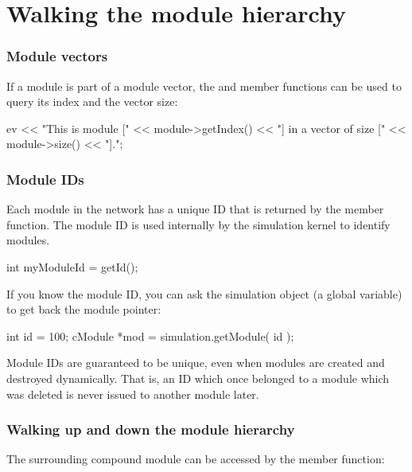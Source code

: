 \section{Walking the module hierarchy}
\label{sec:simple-modules:walking-module-hierarchy}

\subsubsection{Module vectors}


If a module is part of a module vector, the
 and  member functions can be used to
query its index and the vector size:

\begin{cpp}
ev << "This is module [" << module->getIndex() <<
      "] in a vector of size [" << module->size() << "].\n";
\end{cpp}


\subsubsection{Module IDs}


Each module in the network has a unique ID that is returned by the
 member function. The module ID is used
internally by the simulation kernel to identify modules.

\begin{cpp}
int myModuleId = getId();
\end{cpp}

If you know the module ID, you can ask the simulation object
(a global variable) to get back the module pointer:

\begin{cpp}
int id = 100;
cModule *mod = simulation.getModule( id );
\end{cpp}


Module IDs are guaranteed to be unique, even when modules are
created and destroyed dynamically. That is, an ID which once
belonged to a module which was deleted is never issued to another
module later.


\subsubsection{Walking up and down the module hierarchy}


The surrounding compound module can be accessed by the
 member function:

